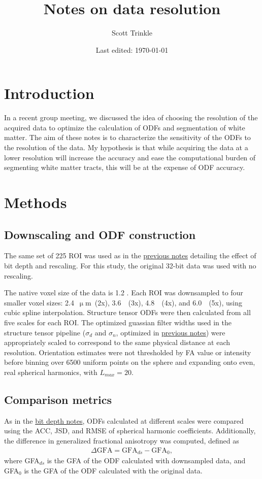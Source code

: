 \documentclass[11pt]{article}
\title{Notes on \uct data resolution}
\author{Scott Trinkle}
\date{Last edited: \today}
\begin{document}
\maketitle

\section{Introduction}
In a recent group meeting, we discussed the idea of choosing the resolution of
the acquired \uct data to optimize the calculation of ODFs and segmentation of
white matter. The aim of these notes is to characterize the sensitivity of the
\uct ODFs to the resolution of the data. My hypothesis is that while acquiring
the data at a lower resolution will increase the accuracy and ease the
computational burden of segmenting white matter tracts, this will be at the
expense of ODF accuracy.

\section{Methods}
\subsection{Downscaling and ODF construction}
The same set of 225 ROI was used as in the
\href{https://github.com/scott-trinkle/uCTdMRI/blob/master/notes/2018-09-17-bit-depth/report/bit_depth_report.pdf}{previous
  notes} detailing the effect of bit depth and rescaling. For this study, the
original 32-bit data was used with no rescaling.

The native voxel size of the data is 1.2 \um. Each ROI was downsampled to four
smaller voxel sizes: 2.4~$\upmu$m~(2x), 3.6~\um~(3x), 4.8~\um~(4x), and
6.0~\um~(5x), using cubic spline interpolation. Structure tensor ODFs were then
calculated from all five scales for each ROI.  The optimized guassian filter
widths used in the structure tensor pipeline ($\sigma_d$ and $\sigma_n$,
optimized in
\href{https://github.com/scott-trinkle/uCTdMRI/tree/master/notes/2018-05-22-tuning-parameters/report}{previous
  notes}) were appropriately scaled to correspond to the same physical distance
at each resolution. Orientation estimates were not thresholded by FA value or
intensity before binning over 6500 uniform points on the sphere and expanding
onto even, real spherical harmonics, with $L_{max}=20$.

\subsection{Comparison metrics}
As in the
\href{https://github.com/scott-trinkle/uCTdMRI/blob/master/notes/2018-09-17-bit-depth/report/bit_depth_report.pdf}{bit
  depth notes}, ODFs calculated at different scales were compared using the ACC,
JSD, and RMSE of spherical harmonic coefficients. Additionally, the difference
in generalized fractional anisotropy was computed, defined as
\begin{align}
  \Delta\text{GFA} = \text{GFA}_{ds} - \text{GFA}_0,
\end{align}
where GFA$_{ds}$ is the GFA of the ODF calculated with downsampled data, and GFA$_0$ is the
GFA of the ODF calculated with the original data.
\end{document}
